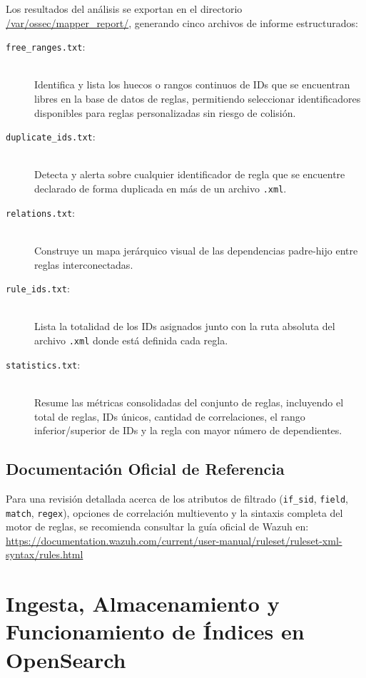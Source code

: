 Los resultados del análisis se exportan en el directorio \url{/var/ossec/mapper_report/}, generando cinco archivos de informe estructurados:

\begin{description}
    \item[\texttt{free\_ranges.txt}:] ~\\
    Identifica y lista los huecos o rangos continuos de IDs que se encuentran libres en la base de datos de reglas, permitiendo seleccionar identificadores disponibles para reglas personalizadas sin riesgo de colisión.

    \item[\texttt{duplicate\_ids.txt}:] ~\\
    Detecta y alerta sobre cualquier identificador de regla que se encuentre declarado de forma duplicada en más de un archivo \texttt{.xml}.

    \item[\texttt{relations.txt}:] ~\\
    Construye un mapa jerárquico visual de las dependencias padre-hijo entre reglas interconectadas.

    \item[\texttt{rule\_ids.txt}:] ~\\
    Lista la totalidad de los IDs asignados junto con la ruta absoluta del archivo \texttt{.xml} donde está definida cada regla.

    \item[\texttt{statistics.txt}:] ~\\
    Resume las métricas consolidadas del conjunto de reglas, incluyendo el total de reglas, IDs únicos, cantidad de correlaciones, el rango inferior/superior de IDs y la regla con mayor número de dependientes.
\end{description}

\subsection{Documentación Oficial de Referencia}

Para una revisión detallada acerca de los atributos de filtrado (\texttt{if\_sid}, \texttt{field}, \texttt{match}, \texttt{regex}), opciones de correlación multievento y la sintaxis completa del motor de reglas, se recomienda consultar la guía oficial de Wazuh en:
\url{https://documentation.wazuh.com/current/user-manual/ruleset/ruleset-xml-syntax/rules.html}


\section{Ingesta, Almacenamiento y Funcionamiento de Índices en OpenSearch}


